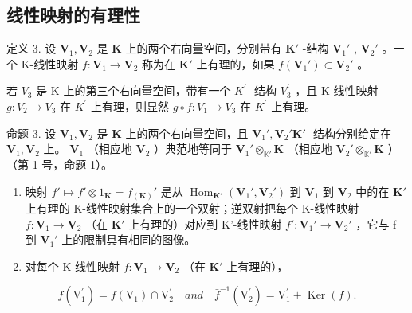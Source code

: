 \subsection{线性映射的有理性}

定义 3. 设 \(\mathbf{V}_1, \mathbf{V}_2\) 是 \(\mathbf{K}\) 上的两个右向量空间，分别带有 \(\mathbf{K}'\) -结构 \(\mathbf{V}_1'\) , \(\mathbf{V}_2'\) 。一个 K-线性映射 \(f: \mathbf{V}_1 \to \mathbf{V}_2\) 称为在 \(\mathbf{K}'\) 上有理的，如果 \(f(\mathbf{V}_1') \subset \mathbf{V}_2'\) 。

若 \(V_{3}\) 是 K 上的第三个右向量空间，带有一个 \(K^{\prime}\) -结构 \(V_{3}^{\prime}\) ，且 K-线性映射 \(g:V_{2}\rightarrow V_{3}\) 在 \(K^{\prime}\) 上有理，则显然 \(g\circ f:V_{1}\rightarrow V_{3}\) 在 \(K^{\prime}\) 上有理。

命题 3. 设 \(\mathbf{V}_1, \mathbf{V}_2\) 是 \(\mathbf{K}\) 上的两个右向量空间，且 \(\mathbf{V}_1', \mathbf{V}_2' \mathbf{K}'\) -结构分别给定在 \(\mathbf{V}_1, \mathbf{V}_2\) 上。 \(\mathbf{V}_1\) （相应地 \(\mathbf{V}_2\) ）典范地等同于 \(\mathbf{V}_1' \otimes_{\mathbb{K}'} \mathbf{K}\) （相应地 \(\mathbf{V}_2' \otimes_{\mathbb{K}'} \mathbf{K}\) ）（第 1 号，命题 1）。

\begin{enumerate}
\def\labelenumi{(\roman{enumi})}
\item
  映射 \(f' \mapsto f' \otimes 1_{\mathbf{K}} = f_{(\mathbf{K})}'\) 是从 \(\operatorname{Hom}_{\mathbf{K}'}(\mathbf{V}_1', \mathbf{V}_2')\) 到 \(\mathbf{V}_1\) 到 \(\mathbf{V}_2\) 中的在 \(\mathbf{K}'\) 上有理的 K-线性映射集合上的一个双射；逆双射把每个 K-线性映射 \(f: \mathbf{V}_1 \to \mathbf{V}_2\) （在 \(\mathbf{K}'\) 上有理的）对应到 K'-线性映射 \(f': \mathbf{V}_1' \to \mathbf{V}_2'\) ，它与 f 到 \(\mathbf{V}_1'\) 上的限制具有相同的图像。
\item
  对每个 K-线性映射 \(f: \mathbf{V}_1 \to \mathbf{V}_2\) （在 \(\mathbf{K}'\) 上有理的），
\end{enumerate}

\[
f (\mathrm{V} _ {1} ^ {\prime}) = f (\mathrm{V} _ {1}) \cap \mathrm{V} _ {2} ^ {\prime} \quad and \quad \bar {f} ^ {- 1} (\mathrm{V} _ {2} ^ {\prime}) = \mathrm{V} _ {1} ^ {\prime} + \operatorname{Ker} (f).
\]

